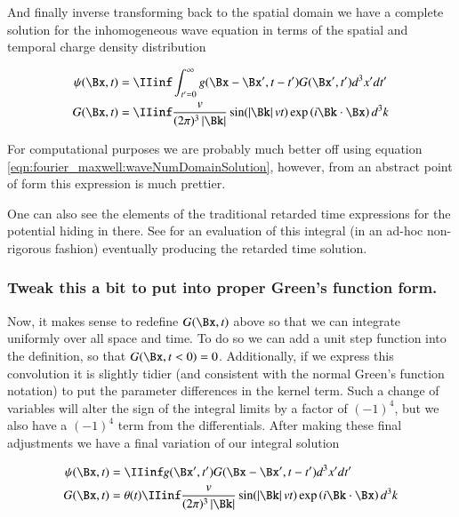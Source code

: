 And finally inverse transforming back to the spatial domain we have a complete solution for the inhomogeneous wave equation in terms of the spatial and temporal charge density distribution

\begin{align}
{\psi}(\Bx, t)
&= \IIinf \int_{t' = 0}^\infty g(\Bx -\Bx', t-t') G(\Bx', t') d^3 x' dt' \\
G(\Bx, t)
&= \IIinf
\frac{v}{(2\pi)^3 \Abs{\Bk}}
\sin( \Abs{\Bk} v t )
\exp\left( i \Bk \cdot \Bx \right)
d^3 k
\end{align}

For computational purposes we are probably much better off using
equation \ref{eqn:fourier_maxwell:waveNumDomainSolution}, however,
from an abstract point of form this expression is much prettier.

One can also see the elements of the traditional retarded time expressions for the potential hiding in there.  See
 for an evaluation of this integral (in an ad-hoc
non-rigorous fashion) eventually producing the retarded time solution.

\subsubsection{Tweak this a bit to put into proper Green's function form. }

Now, it makes sense to redefine $G(\Bx,t)$ above so that we can integrate
uniformly over all space and time.  To do so we can add a unit step function
into the definition, so that $G(\Bx,t<0) = 0$.
Additionally, if we express this convolution it is slightly tidier (and consistent with the normal Green's function notation)
to put the parameter differences in the kernel term.  Such a change of variables will alter the sign of the integral limits
by a factor of $(-1)^4$, but we also have a $(-1)^4$ term from the differentials.  After making these final adjustments
we have a final variation of our integral solution

%
% 
%
%
% 
% 
\begin{align}
{\psi}(\Bx, t)
&= \IIinf g(\Bx', t') G(\Bx - \Bx', t - t') d^3 x' dt' \\
G(\Bx, t)
&= \theta(t) \IIinf
\frac{v}{(2\pi)^3 \Abs{\Bk}}
\sin( \Abs{\Bk} v t )
\exp\left( i \Bk \cdot \Bx \right)
d^3 k
\end{align}

